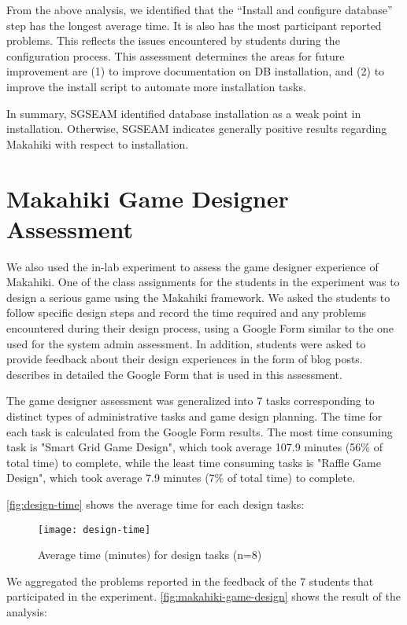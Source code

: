 From the above analysis, we identified that the ``Install and configure database'' step has the
longest average time. It is also has the most participant reported problems. This reflects the issues
encountered by students during the configuration process. This assessment determines the areas for future
improvement are (1) to improve documentation on DB installation, and (2) to improve the install script to automate
more installation tasks.

In summary, SGSEAM identified database installation as a weak point in
installation.  Otherwise, SGSEAM indicates generally positive results regarding
Makahiki with respect to installation.

\section{Makahiki Game Designer Assessment}

We also used the in-lab experiment to assess the game
designer experience of Makahiki. One of the class assignments for the students in the
experiment was to design a serious game using the Makahiki framework. We asked the students
to follow specific design steps and record the time required and any problems encountered during
their design process, using a Google Form similar to the one used for the system admin
assessment. In addition, students were asked to provide feedback about their
design experiences in the form of blog posts. \cite{csdl2-13-04} describes in detailed
the Google Form that is used in this assessment.

The game designer assessment was generalized into 7 tasks corresponding to
distinct types of administrative tasks and game design planning. The time for each task is
calculated from the Google Form results.  The most time consuming task
 is "Smart Grid Game Design", which took average 107.9 minutes (56\% of total time) to complete,
 while the least time
  consuming tasks is "Raffle Game Design", which took average 7.9 minutes (7\% of total time)
  to complete.

\autoref{fig:design-time} shows the average time for each design tasks:

\begin{figure}[ht!]
  \center
  \texttt{[image: design-time]}
  \caption{Average time (minutes) for design tasks (n=8)}
  \label{fig:design-time}
\end{figure}

 We aggregated the problems reported in the feedback of the 7 students that participated in the experiment.
\autoref{fig:makahiki-game-design} shows the result of the analysis:

